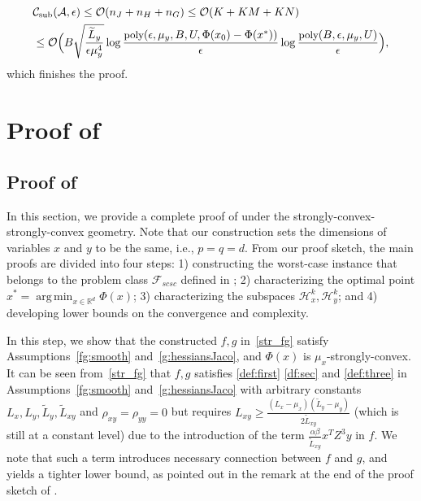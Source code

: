\documentclass{osudissert96}
\DeclareMathOperator*{\argmin}{arg\,min}
\begin{document}
\begin{align}
&\mathcal{C}_{\text{\normalfont sub}}(\mathcal{A},\epsilon) \leq \mathcal{O}(n_J+n_H + n_G)\leq \mathcal{O}(K+KM+KN) \nonumber
\\&\leq \mathcal{O}\Big(B\sqrt{\frac{\widetilde L_y}{\epsilon\mu_y^4}}\log\frac{\mbox{\small poly}(\epsilon,\mu_y,B,U,\Phi(x_{0})-\Phi(x^*))}{\epsilon}  \log \frac{\mbox{\small poly}(B,\epsilon,\mu_y,U)}{\epsilon} \Big), 
\end{align}
which finishes the proof. 

\chapter{Proof of }\label{appendix:lower_bilevel}

\section{Proof of }\label{appen:thm1}
In this section, we provide a complete proof of  under the strongly-convex-strongly-convex geometry. Note that our construction sets the dimensions of variables $x$ and $y$ to be the same, i.e.,  $p=q=d$.   
 From our proof sketch, the main proofs are divided into four steps: 1) constructing the worst-case instance that belongs to the problem class $\mathcal{F}_{scsc}$ defined in ; 2) characterizing the optimal point $x^*=\argmin_{x\in\mathbb{R}^d}\Phi(x)$; 3) characterizing the subspaces $\mathcal{H}_x^k,\mathcal{H}_y^k$; and 4) developing lower bounds on the convergence and complexity.  

\vspace{0.2cm}
\vspace{0.2cm}

In this step, we show that the constructed $f,g$ in~\cref{str_fg} satisfy Assumptions~\ref{fg:smooth} and~\ref{g:hessiansJaco}, and $\Phi(x)$ is $\mu_x$-strongly-convex. It can be seen from~\cref{str_fg} that $f,g$ satisfies \cref{def:first} \eqref{df:sec} and \eqref{def:three} in Assumptions~\ref{fg:smooth} and~\ref{g:hessiansJaco} with arbitrary constants $L_x,L_y,\widetilde L_y,\widetilde L_{xy}$ and $\rho_{xy}=\rho_{yy}=0$ but requires $L_{xy}\geq \frac{(L_x-\mu_x)(\widetilde L_y-\mu_y)}{2\widetilde L_{xy}}$ (which is still at a constant level) due to the introduction of the term $\frac{\alpha\beta}{\widetilde L_{xy}}x^TZ^3y$ in $f$. We note that such a term introduces necessary connection between $f$ and $g$, and yields a tighter lower bound, as pointed out in the remark at the end of the proof sketch of . 
\end{document}
